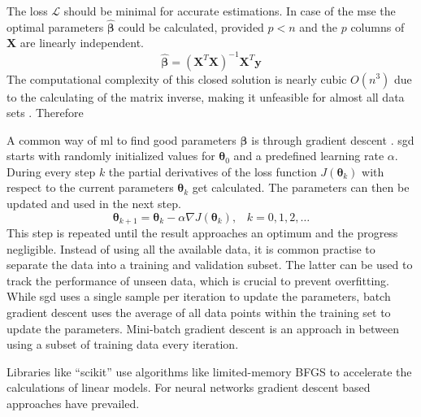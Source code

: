 The loss $\mathcal{L}$ should be minimal for accurate estimations. In case of the \gls{mse} the optimal parameters $\boldsymbol{\hat{\beta}}$ could be calculated, provided $p < n$ and the $p$ columns of $\mathbf{X}$ are linearly independent.
\begin{equation}
    \boldsymbol{\hat{\beta}} = (\mathbf{X}^T\mathbf{X})^{-1}\mathbf{X}^{T}\mathbf{y}
\end{equation}
The computational complexity of this closed solution is nearly cubic $O(n^3)$ due to the calculating of the matrix inverse, making it unfeasible for almost all data sets \autocite{riahi2023}. Therefore   

A common way of \gls{ml} to find good parameters $\boldsymbol{\beta}$ is through gradient descent \autocite{robbins1951}. 
\gls{sgd} starts with randomly initialized values for $\boldsymbol{\theta}_0$ and a predefined learning rate $\alpha$. 
During every step $k$ the partial derivatives of the loss function $J(\boldsymbol{\theta}_k)$ with respect to the current parameters $\boldsymbol{\theta}_k$ get calculated. The parameters can then be updated and used in the next step.
\begin{equation}
    \boldsymbol{\theta}_{k+1} = \boldsymbol{\theta}_k - \alpha\nabla J(\boldsymbol{\theta}_k)\text{,}\quad k=0,1,2,\ldots
\end{equation}
This step is repeated until the result approaches an optimum and the progress negligible. Instead of using all the available data, it is common practise to separate the data into a training and validation subset. The latter can be used to track the performance of unseen data, which is crucial to prevent overfitting. While \gls{sgd} uses a single sample per iteration to update the parameters, batch gradient descent uses the average of all data points within the training set to update the parameters. Mini-batch gradient descent is an approach in between using a subset of training data every iteration. 



Libraries like ``scikit'' use algorithms like limited-memory BFGS to accelerate the calculations of linear models. For neural networks gradient descent based approaches have prevailed.

